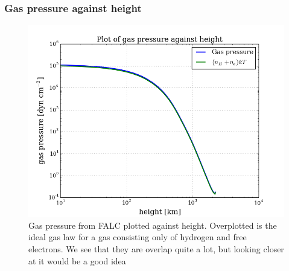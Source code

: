 \documentclass{article}
\begin{document}
\subsubsection{Gas pressure against height}
\begin{figure}[H]
  \centering
  \includegraphics[scale=0.5]{../figures/falc/falc_h_pgas_0.png}
  \caption{Gas pressure from FALC plotted against height. Overplotted is the ideal gas law for a gas consisting only of hydrogen and free electrons. We see that they are overlap quite a lot, but looking closer at it would be a good idea}
\end{figure}
\end{document}

